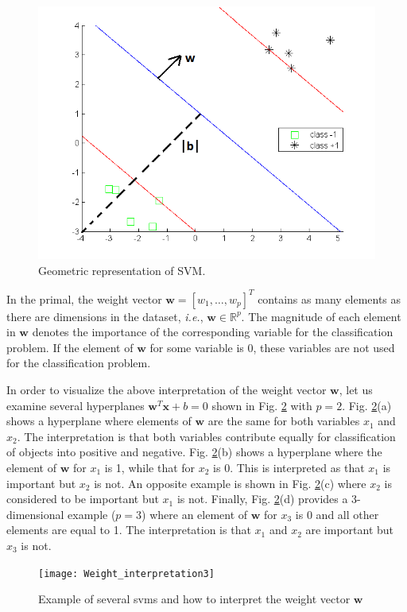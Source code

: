 \begin{figure}[h!]
	\centering
	\includegraphics[width=0.7\linewidth]{images/SVM_interpretation2}
	\caption{Geometric representation of SVM.}
	\label{fig:SVM_interpretation}
\end{figure}

In the primal, the weight vector $\textbf{w} = [w_1, \ldots, w_p]^T$ contains as many elements as there are dimensions in the dataset, \textit{i.e.}, $\textbf{w} \in \mathbb{R}^p$. The magnitude of each element in $\textbf{w}$ denotes the importance of the corresponding variable for the classification problem. If the element of $\textbf{w}$ for some variable is 0, these variables are not used for the classification problem.

In order to visualize the above interpretation of the weight vector $\textbf{w}$, let us examine several hyperplanes $\textbf{w}^T\textbf{x}+b=0$ shown in Fig. \ref*{fig:Weight_interpretation} with $p=2$. Fig. \ref{fig:Weight_interpretation}(a) shows a hyperplane where elements of $\textbf{w}$ are the same for both variables $x_1$ and $x_2$. The interpretation is that both variables contribute equally for classification of objects into positive and negative. Fig. \ref{fig:Weight_interpretation}(b) shows a hyperplane where the element of $\textbf{w}$ for $x_1$ is 1, while that for $x_2$ is 0. This is interpreted as that $x_1$ is important but $x_2$ is not. An opposite example is shown in Fig. \ref{fig:Weight_interpretation}(c) where $x_2$ is considered to be important but $x_1$ is not. Finally, Fig. \ref{fig:Weight_interpretation}(d) provides a 3-dimensional example ($p=3$) where an element of $\textbf{w}$ for $x_3$ is 0 and all other elements are equal to 1. The interpretation is that $x_1$ and $x_2$ are important but $x_3$ is not.

\begin{figure}[h!]
	\centering
	\texttt{[image: Weight\_interpretation3]}
	\caption{Example of several {\sc svm}s and how to interpret the weight vector $\textbf{w}$}
	\label{fig:Weight_interpretation}
\end{figure}

